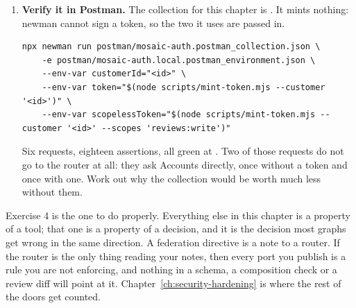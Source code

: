 \begin{enumerate}
  \begin{verbatim}
docker logs mosaic-graph-mosaic-accounts-1 | grep -c Mosaic.RequestTimeline
  \end{verbatim}

  The transport turns out to make no difference and the selection set makes all
  of it. Then set  to
  , recreate the router, and count again: one of the two zeroes
  becomes a one, which is what tells you the setting caused it rather than the
  planner. Write down how many of those runs you would have made before writing
  the sentence.

  \item \textbf{Verify it in Postman.} The collection for this chapter is
  . It mints nothing: newman cannot sign a token, so
  the two it uses are passed in.

  \begin{verbatim}
npx newman run postman/mosaic-auth.postman_collection.json \
    -e postman/mosaic-auth.local.postman_environment.json \
    --env-var customerId="<id>" \
    --env-var token="$(node scripts/mint-token.mjs --customer '<id>')" \
    --env-var scopelessToken="$(node scripts/mint-token.mjs --customer '<id>' --scopes 'reviews:write')"
  \end{verbatim}

  Six requests, eighteen assertions, all green at \code{ch15}. Two of those
  requests do not go to the router at all: they ask Accounts directly, once
  without a token and once with one. Work out why the collection would be worth
  much less without them.
\end{enumerate}

Exercise 4 is the one to do properly. Everything else in this chapter is a
property of a tool; that one is a property of a decision, and it is the decision
most graphs get wrong in the same direction. A federation directive is a note to
a router. If the router is the only thing reading your notes, then every port
you publish is a rule you are not enforcing, and nothing in a schema, a
composition check or a review diff will point at it.
Chapter~\ref{ch:security-hardening} is where the rest of the doors get counted.
